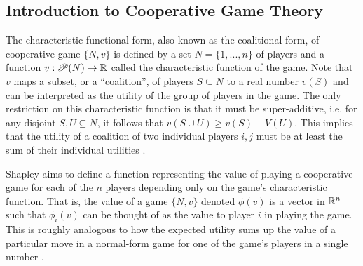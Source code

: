 \subsection{Introduction to Cooperative Game Theory}
\label{sec:intro}

The characteristic functional form, also known as the coalitional form, of cooperative game $\{N,v\}$ is defined by a set $N = \{1,...,n\}$ of players and a function $v: \mathscr{P}(N) \to \mathbb{R}$ called the characteristic function of the game. Note that $v$ maps a subset, or a ``coalition'', of players $S \subseteq N$ to a real number $v(S)$ and can be interpreted as the utility of the group of players in the game.  The only restriction on this characteristic function is that it must be super-additive, i.e. for any disjoint $S, U \subseteq N$, it follows that $v(S \cup U) \geq v(S) + V(U)$. This implies that the utility of a coalition of two individual players $i,j$ must be at least the sum of their individual utilities \citep{shapEssays}.

Shapley aims to define a function representing the value of playing a cooperative game for each of the $n$ players depending only on the game's characteristic function.  That is, the value of a game $\{N,v\}$ denoted $\phi(v)$ is a vector in $\mathbb{R}^n$ such that $\phi_i(v)$ can be thought of as the value to player $i$ in playing the game.  This is roughly analogous to how the expected utility sums up the value of a particular move in a normal-form game for one of the game's players in a single number \citep{shapEssays}.